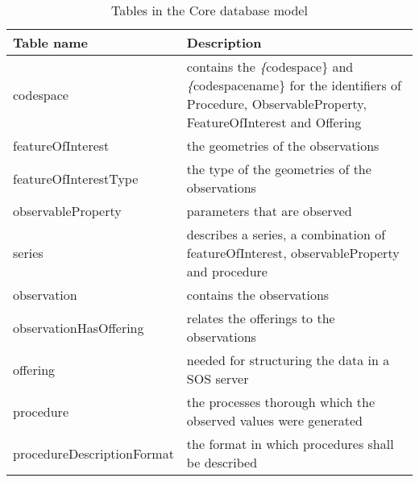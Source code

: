 \begin{table}[]
\centering
\caption{Tables in the Core database model}
\label{my-label}
\begin{tabular}{@{}ll@{}}
\toprule
Table name                 & Description                                                                                                                                                \\ \midrule
codespace                  & contains the \textit\{codespace\} and \textit\{codespacename\} for the identifiers of Procedure, ObservableProperty, FeatureOfInterest and Offering        \\
featureOfInterest          & the geometries of the observations                                                                                                                         \\
featureOfInterestType      & the type of the geometries of the observations                                                                                                             \\
observableProperty         & parameters that are observed                                                                                                                               \\
series                     & describes a series, a combination of featureOfInterest, observableProperty and procedure                                                                   \\
observation                & contains the observations                                                                                                                                  \\
observationHasOffering     & relates the offerings to the observations                                                                                                                  \\
offering                   & needed for structuring the data in a SOS server                                                                                                            \\
procedure                  & the processes thorough which the observed values were generated                                                                                            \\
procedureDescriptionFormat & the format in which procedures shall be described                                                                                                          \\

\end{tabular}
\end{table}
